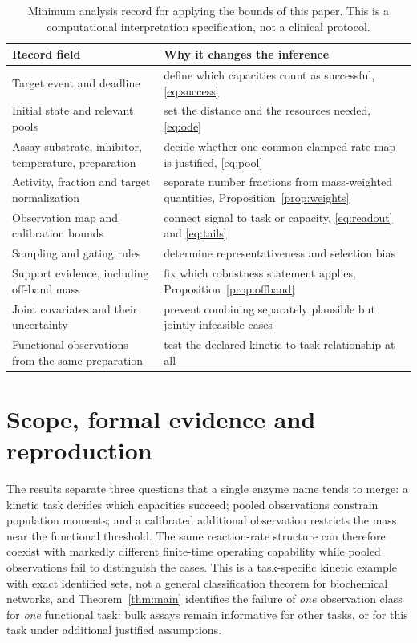 \documentclass[11pt]{article}
\theoremstyle{definition}
\begin{document}
\begin{table}[ht]
\centering\small
\begin{tabularx}{\linewidth}{@{}>{\raggedright\arraybackslash}p{.36\linewidth}>{\raggedright\arraybackslash}X@{}}
\toprule
Record field & Why it changes the inference\\
\midrule
Target event and deadline & define which capacities count as successful,
\eqref{eq:success}\\
Initial state and relevant pools & set the distance and the resources needed,
\eqref{eq:ode}\\
Assay substrate, inhibitor, temperature, preparation & decide whether one
common clamped rate map is justified, \eqref{eq:pool}\\
Activity, fraction and target normalization & separate number fractions from
mass-weighted quantities, Proposition~\ref{prop:weights}\\
Observation map and calibration bounds & connect signal to task or capacity,
\eqref{eq:readout} and \eqref{eq:tails}\\
Sampling and gating rules & determine representativeness and selection bias\\
Support evidence, including off-band mass & fix which robustness statement
applies, Proposition~\ref{prop:offband}\\
Joint covariates and their uncertainty & prevent combining separately
plausible but jointly infeasible cases\\
Functional observations from the same preparation & test the declared
kinetic-to-task relationship at all\\
\bottomrule
\end{tabularx}
\caption{Minimum analysis record for applying the bounds of this paper. This is
a computational interpretation specification, not a clinical
protocol.}\label{tab:record}
\end{table}

\section{Scope, formal evidence and reproduction}\label{sec:evidence}
The results separate three questions that a single enzyme name tends to merge:
a kinetic task decides which capacities succeed; pooled observations constrain
population moments; and a calibrated additional observation restricts the mass
near the functional threshold. The same reaction-rate structure can therefore
coexist with markedly different finite-time operating capability while pooled
observations fail to distinguish the cases. This is a task-specific kinetic
example with exact identified sets, not a general classification theorem for
biochemical networks, and Theorem~\ref{thm:main} identifies the failure of
\emph{one} observation class for \emph{one} functional task: bulk assays remain
informative for other tasks, or for this task under additional justified
assumptions.
\end{document}
